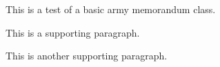 \documentclass{armymemo}
\begin{document}
\AMsethead

\Ni This is a test of a basic army memorandum class.

\Nii This is a supporting paragraph.

\Nii This is another supporting paragraph.

\Ni \lipsum[1]

\Nii \lipsum[2]

\Nii \lipsum[3]

\Niii \lipsum[4]

\Niii \lipsum[5]

\Ni \lipsum[6]

\end{document}
